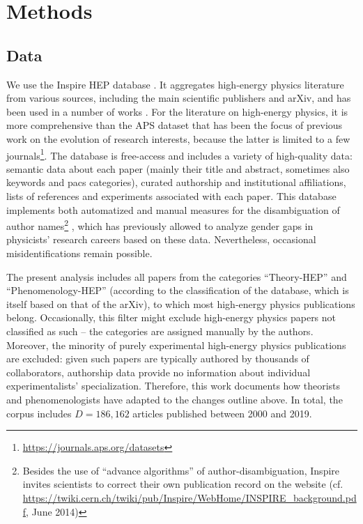 \documentclass{article}
\begin{document}
\section{\label{sec:methods}Methods}

\subsection{\label{sec:data}Data}

We use the Inspire HEP database \citep{InspireAPI}. It aggregates high-energy physics literature from various sources, including the main scientific publishers and arXiv, and has been used in a number of works \citep{Perovi2016,Chall2019a,Strumia2021,Sikimi2022,Gautheron2023}. For the literature on high-energy physics, it is more comprehensive than the APS dataset that has been the focus of previous work on the evolution of research interests, because the latter is limited to a few journals\footnote{\url{https://journals.aps.org/datasets}}. The database is free-access and includes a variety of high-quality data: semantic data about each paper (mainly their title and abstract, sometimes also keywords and \gls{pacs} categories), curated authorship and institutional affiliations, lists of references and experiments associated with each paper. This database implements both automatized and manual measures for the disambiguation of author names\footnote{Besides the use of ``advance algorithms'' of author-disambiguation, Inspire invites scientists to correct their own publication record on the website (cf. \url{https://twiki.cern.ch/twiki/pub/Inspire/WebHome/INSPIRE_background.pdf}, June 2014)} %
, which has previously allowed \citet{Strumia2021} to analyze gender gaps in physicists' research careers based on these data. Nevertheless, occasional misidentifications remain possible. %

The present analysis includes all papers from the categories ``Theory-HEP'' and ``Phenomenology-HEP'' (according to the classification of the database, which is itself based on that of the arXiv), to which most high-energy physics publications belong. Occasionally, this filter might exclude high-energy physics papers not classified as such -- the categories are assigned manually by the authors. Moreover, the minority of purely experimental high-energy physics publications are excluded: given such papers are typically authored by thousands of collaborators, authorship data provide no information about individual experimentalists' specialization. Therefore, this work documents how theorists and phenomenologists have adapted to the changes outline above. In total, the corpus includes $D=186,162$ articles published between 2000 and 2019.
\end{document}
